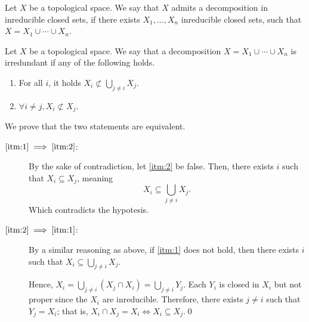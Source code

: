 \documentclass{subfiles}
\begin{document}
    \begin{definition*}
        Let \(X\) be a topological space. We say that \(X\) admits a decomposition
            in inreducible closed sets, if there exists \(X_{1}, \ldots, X_{n}\)
            inreducible closed sets, such that \(X = X_{1} \cup \cdots \cup X_{n}\).
    \end{definition*}

    \begin{lemma*}
        Let \(X\) be a topological space. We say that a decomposition 
            \(X = X_{1} \cup \cdots \cup X_{n}\) is irredundant if any of the following holds.
            \begin{enumerate}
                \item \label{itm:1} For all \(i\), it holds \(X_{i} \not\subset \bigcup_{j \ne i} X_{j}\).
                \item \label{itm:2} \(\forall i \ne j, X_{i} \not\subset X_{j}\).
            \end{enumerate}
    \end{lemma*}

    \begin{proof*}
        We prove that the two statements are equivalent.
        \begin{description}
            \item [\(\ref{itm:1} \implies \ref{itm:2}\):] By the sake of contradiction, let \ref{itm:2} be false.
                Then, there exists \(i\) such that \(X_{i} \subseteq X_{j}\), 
                meaning 
                \[
                    X_{i} \subseteq \bigcup_{j \ne i} X_{j}.
                \]
                Which contradicts the hypotesis.

            \item [\(\ref{itm:2} \implies \ref{itm:1}\):] By a similar reasoning as above, 
                if \ref{itm:1} does not hold, then there exists \(i\) such that 
                \(X_{i} \subseteq \bigcup_{j \ne i} X_{j}\).

                Hence, \(X_{i} = \bigcup_{j \ne i} (X_{j} \cap X_{i}) = \bigcup_{j \ne i} Y_{j}\).
                Each \(Y_{i}\) is closed in \(X_{i}\) but not proper since the \(X_{i}\)
                    are inreducible.
                Therefore, there exists \(j \ne i\) such that \(Y_{j} = X_{i}\);
                that is, \(X_{i} \cap X_{j} = X_{i} \iff X_{i} \subseteq X_{j}\).\qed
        \end{description}
    \end{proof*}
    
\end{document}
